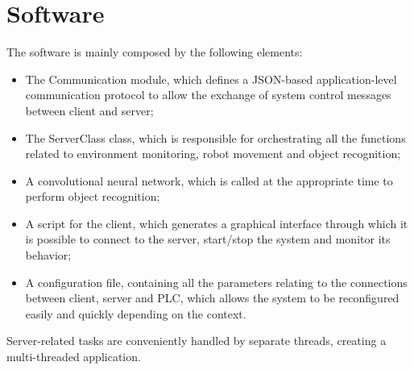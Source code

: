 \documentclass[a4paper,11pt]{report}
\theoremstyle{definition}
\theoremstyle{plain}
\begin{document}
    \section{Software}
        The software is mainly composed by the following elements:
        \begin{itemize}
            \item The Communication module, which defines a JSON-based application-level communication protocol to allow the exchange of system control messages between client and server;
            \item The ServerClass class, which is responsible for orchestrating all the functions related to environment monitoring, robot movement and object recognition;
            \item A convolutional neural network, which is called at the appropriate time to perform object recognition;
            \item A script for the client, which generates a graphical interface through which it is possible to connect to the server, start/stop the system and monitor its behavior;
            \item A configuration file, containing all the parameters relating to the connections between client, server and PLC, which allows the system to be reconfigured easily and quickly depending on the context.
        \end{itemize}
        Server-related tasks are conveniently handled by separate threads, creating a multi-threaded application.
\end{document}
